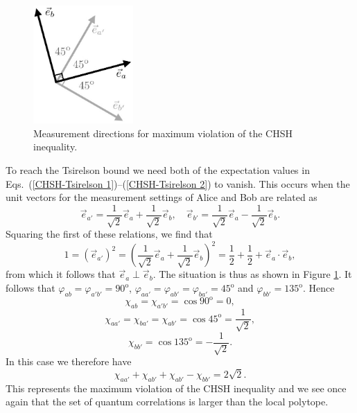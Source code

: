 \begin{figure}[h]
\centering
    \includegraphics[width=1.5in]{vectorsCHSH.jpeg}
 \caption{Measurement directions for maximum violation of the CHSH inequality.}
   \label{vectorsCHSH}
\end{figure}

To reach the Tsirelson bound we need both of the expectation values in Eqs.\ (\ref{CHSH-Tsirelson 1})--(\ref{CHSH-Tsirelson 2}) to vanish. This occurs when the unit vectors for the measurement settings of Alice and Bob are related as 
\begin{equation}
\vec{e}_{a'}=\frac{1}{\sqrt{2}}\vec{e}_a+\frac{1}{\sqrt{2}}\vec{e}_b,\quad \vec{e}_{b'}= \frac{1}{\sqrt{2}}\vec{e}_a- \frac{1}{\sqrt{2}}\vec{e}_b. 
\end{equation}
Squaring the first of these relations, we find that
\begin{equation}
1 = \left( \vec{e}_{a'} \right)^2 = \left( \frac{1}{\sqrt{2}}\vec{e}_a+\frac{1}{\sqrt{2}}\vec{e}_b \right)^2 = \frac12 + \frac12 + \vec{e}_{a} \! \cdot \vec{e}_{b},
\end{equation}
from which it follows that $\vec{e}_{a} \perp \vec{e}_{b}$. The situation is thus as shown in Figure \ref{vectorsCHSH}. It follows that $\varphi_{ab} =  \varphi_{a'b'} = 90^{\mathrm{o}}$, $\varphi_{aa'} =  \varphi_{ab'} = \varphi_{ba'} = 45^{\mathrm{o}}$ and $\varphi_{bb'} =  135^{\mathrm{o}}$. Hence
\begin{equation*}
\chi_{ab}=\chi_{a'b'}= \cos{90^{\mathrm{o}}} = 0,
\end{equation*}
\begin{equation}
\chi_{aa'}=\chi_{ba'}=\chi_{ab'}= \cos{45^{\mathrm{o}}} = \frac{1}{\sqrt{2}},
\end{equation}
\begin{equation*}
\chi_{bb'}= \cos{135^{\mathrm{o}}} = - \frac{1}{\sqrt{2}}.
\end{equation*}
In this case we therefore have
\begin{equation}
\chi_{aa'}+\chi_{ab'}+\chi_{ab'}-\chi_{bb'} =2\sqrt{2}.
\label{CHSH-Tsirelson 5}
\end{equation}
This represents the maximum violation of the CHSH inequality and we see once again that the set of quantum correlations is larger than the local polytope.

